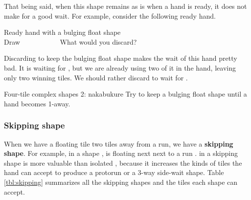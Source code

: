 \bigskip
That being said, when this shape remains as is when a hand is ready, it does not make for a good wait. For example, consider the following ready hand. 
\begin{itembox}[r]{Ready hand with a bulging float shape}
\bp
{}\bei\zhong\zhong\zhong~\\
\hfill\footnotesize{Draw~~~~~~~~~~~}
\ep 
\vspace{-15pt}What would you discard? \vspace{-5pt}
\end{itembox}
\noindent
Discarding {\LARGE\bei} to keep the bulging float shape {\LARGE{}} makes the wait of this hand pretty bad. It is waiting for {\LARGE{}}, but we are already using two of it in the hand, leaving only two winning tiles. We should rather discard {\LARGE{}} to wait for {\LARGE\bei}. 

\vfill
\color{MyRed}
\begin{itembox}[c]{Four-tile complex shapes 2: {\jap nakabukure}}
\normalcolor
Try to keep a bulging float shape until a hand becomes 1-away.
\end{itembox}\normalcolor

\subsubsection{Skipping shape}
When we have a floating tile two tiles away from a run, we have a {\bf skipping shape}. For example, in a shape {\LARGE{}}, {\LARGE{}} is floating next next to a run {\LARGE{}}. {\LARGE{}} in a skipping shape is more valuable than isolated {\LARGE{}}, because it increases the kinds of tiles the hand can accept to produce a protorun or a 3-way side-wait shape. Table \ref{tbl:skipping} summarizes all the skipping shapes and the tiles each shape can accept. 

